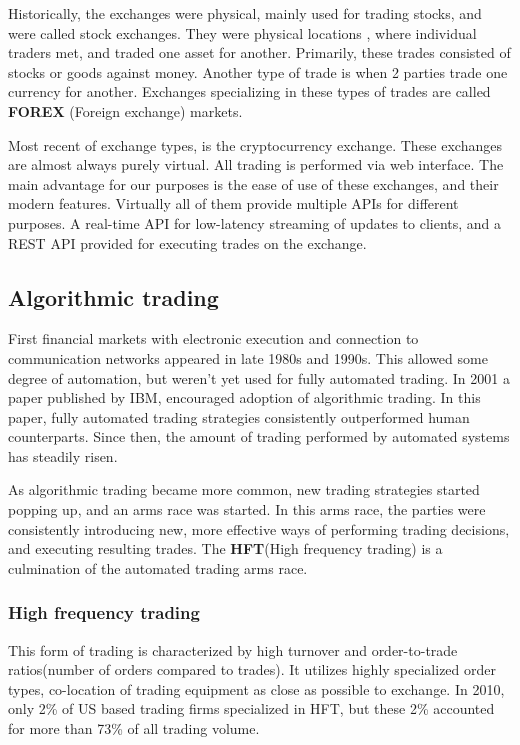 Historically, the exchanges were physical, mainly used for trading stocks, and
were called stock exchanges. They were physical locations , where individual traders met, and traded one asset for another.
Primarily, these trades consisted of stocks or goods against money. Another type of trade is when 2 parties trade one currency for another.
Exchanges specializing in these types of trades are called \textbf{FOREX} (Foreign exchange) markets.

Most recent of exchange types, is the cryptocurrency exchange. These exchanges are almost always purely virtual. All trading is performed
via web interface. The main advantage for our purposes is the ease of use of these exchanges, and their modern features.
Virtually all of them provide multiple APIs for different purposes. A real-time API for low-latency streaming of updates to clients,
and a REST API provided for executing trades on the exchange.

\subsection{Algorithmic trading}
First financial markets with electronic execution and connection to communication networks appeared
in late 1980s and 1990s. This allowed some degree of automation, but weren't yet used for fully
automated trading. In 2001 a paper published by IBM\cite{Tesauro:2001:HBA:501158.501183},
encouraged adoption of algorithmic trading. In this paper, fully automated trading strategies
consistently outperformed human counterparts. Since then, the amount of trading performed by
automated systems has steadily risen.

As algorithmic trading became more common, new trading strategies started popping up, and
an arms race was started. In this arms race, the parties were consistently introducing new,
more effective ways of performing trading decisions, and executing resulting trades. The \textbf{HFT}(High frequency trading)
is a culmination of the automated trading arms race.

\subsubsection{High frequency trading}
This form of trading is characterized by high turnover and order-to-trade ratios(number of orders compared to trades).
It utilizes highly specialized order types, co-location of trading equipment as close as possible to exchange.
In 2010, only 2\% of US based trading firms specialized in HFT, but these 2\% accounted for more than 73\% of all
trading volume\cite{article:computerized_trading}.


